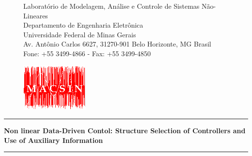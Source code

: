 
\begin{titlepage}

\begin{figure}[!ht]
\begin{minipage}[b]{0.7\linewidth}
\begin{tiny}
Laboratório de Modelagem, Análise e Controle de Sistemas Não-Lineares \\
Departamento de Engenharia Eletrônica\\
Universidade Federal de Minas Gerais\\
Av. Antônio Carlos 6627, 31270-901 Belo Horizonte, MG Brasil\\

Fone: +55 3499-4866 - Fax: +55 3499-4850 %
\end{tiny}
\end{minipage}\hfill
\begin{minipage}[c]{0.3\linewidth}
\begin{flushright}
\vspace{-1.2cm}
\includegraphics[scale=1.37]{mac.png}
\end{flushright}
\end{minipage}
\end{figure}

\vspace{1.75cm}
\begin{center}
\thickhrulefill
\par\nobreak
\vspace*{10pt}%
\hrule
\vspace*{10pt}%
{\bf \Huge \bfseries Non linear Data-Driven Contol: Structure Selection of Controllers and Use of Auxiliary Information}
\vspace*{10pt}%
\hrule
\vspace*{40pt}%


\end{center}
\end{titlepage}
